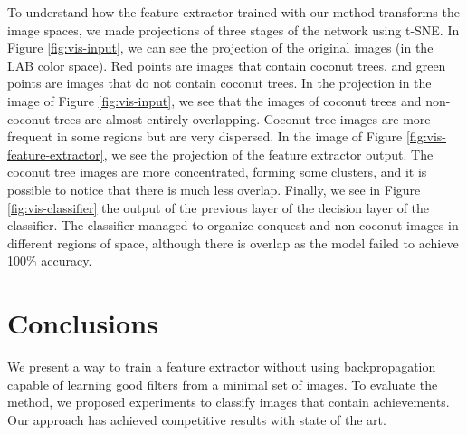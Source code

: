 \documentclass[a4paper,conference]{IEEEtran}
\begin{document}
To understand how the feature extractor trained with our method transforms the image spaces, we made projections of three stages of the network using t-SNE. In Figure \ref{fig:vis-input}, we can see the projection of the original images (in the LAB color space). Red points are images that contain coconut trees, and green points are images that do not contain coconut trees. In the projection in the image of Figure \ref{fig:vis-input}, we see that the images of coconut trees and non-coconut trees are almost entirely overlapping. Coconut tree images are more frequent in some regions but are very dispersed. In the image of Figure \ref{fig:vis-feature-extractor}, we see the projection of the feature extractor output. The coconut tree images are more concentrated, forming some clusters, and it is possible to notice that there is much less overlap. Finally, we see in Figure \ref{fig:vis-classifier} the output of the previous layer of the decision layer of the classifier. The classifier managed to organize conquest and non-coconut images in different regions of space, although there is overlap as the model failed to achieve 100\% accuracy.

\section{Conclusions}

We present a way to train a feature extractor without using backpropagation capable of learning good filters from a minimal set of images. To evaluate the method, we proposed experiments to classify images that contain achievements. Our approach has achieved competitive results with state of the art.



\end{document}
